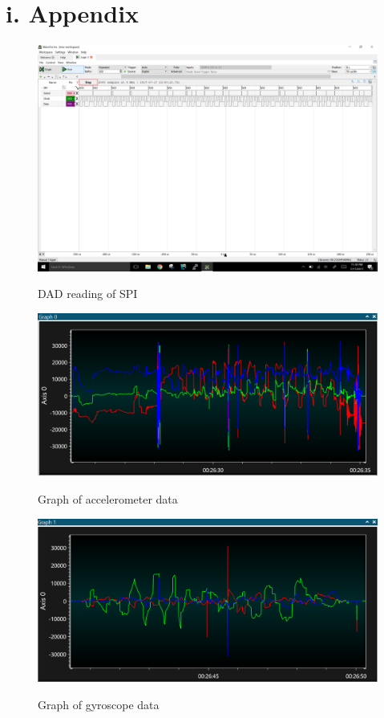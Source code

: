 \documentclass[11pt]{article}
\theoremstyle{plain}
\theoremstyle{definition}
\begin{document}
\section*{i. Appendix}
\begin{figure}[H]
	\centering
	\includegraphics[width=\textwidth]{dad}
	\label{fig:a}
	\caption{DAD reading of SPI}
\end{figure}
\begin{figure}[H]
	\centering
	\includegraphics[width=\textwidth]{accel}
	\label{fig:b}
	\caption{Graph of accelerometer data}
\end{figure}
\begin{figure}[H]
	\centering
	\includegraphics[width=\textwidth]{gyro}
	\label{fig:c}
	\caption{Graph of gyroscope data}
\end{figure}
\end{document}
